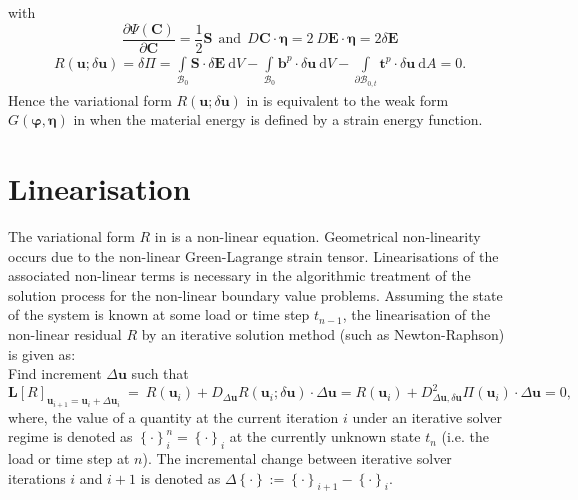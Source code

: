 with 
\begin{equation}
\dfrac{\partial \Psi (\mathbf{C})}{\partial \mathbf{C}} = \dfrac{1}{2} \mathbf{S} \ \ \text{and} \ \ D \mathbf{C} \cdot \bm{\eta} = 2 \ D \mathbf{E} \cdot \bm{\eta} = 2 \delta \mathbf{E}
\label{eq:2.12.2}
\end{equation}
\begin{align}
R(\mathbf{u}; \delta \mathbf{u}) =\delta \Pi = \int\limits_{\mathcal{B}_0} \mathbf{S} \cdot \delta \mathbf{E} \ \mathrm{d}V - \int\limits_{\mathcal{B}_0} \mathbf{b}^p \cdot \delta \mathbf{u} \ \mathrm{d}V - \int\limits_{\mathcal{\partial B}_{0,t}} \mathbf{t}^p \cdot \delta \mathbf{u} \ \mathrm{d}A = 0. 
\label{eq:2.13}
\end{align}
Hence the variational form $R(\mathbf{u}; \delta \mathbf{u})$ in  is equivalent to the weak form $G(\bm{\varphi},\bm{\eta})$ in  when the material energy is defined by a strain energy function. 

\section{Linearisation}
The variational form $R$ in  is a non-linear equation. Geometrical non-linearity occurs due to the non-linear Green-Lagrange strain tensor. Linearisations of the associated non-linear terms is necessary in the algorithmic treatment of the solution process for the non-linear boundary value problems. Assuming the state of the system is known at some load or time step $t_{n-1}$, the linearisation of the non-linear residual $R$ by an iterative solution method (such as Newton-Raphson) is given as: \\
\noindent Find increment $\Delta \mathbf{u}$ such that 
\begin{equation}
\mathbf{L}\left[ R \right]_{\mathbf{u}_{i+1} = \mathbf{u}_{i} + \Delta \mathbf{u}_i} \ = \ R(\mathbf{u}_{i}) + D_{\Delta\mathbf{u}} R(\mathbf{u}_i; \delta \mathbf{u}) \cdot \Delta\mathbf{u} = R(\mathbf{u}_{i}) + D^2_{\Delta\mathbf{u}, \delta\mathbf{u}} \Pi(\mathbf{u}_{i}) \cdot \Delta\mathbf{u} = 0,
\label{eq:2.14}
\end{equation}
where, the value of a quantity at the current iteration $i$ under an iterative solver regime is denoted as ${\left\lbrace \cdot \right\rbrace}_{i}^{n} = {\left\lbrace \cdot \right\rbrace}_{i}$ at the currently unknown state $t_n$ (i.e. the load or time step at $n$). The incremental change between iterative solver iterations $i$ and $i+1$ is denoted as $\Delta \left\lbrace \cdot \right\rbrace := {\left\lbrace \cdot \right\rbrace}_{i+1} - {\left\lbrace \cdot \right\rbrace}_{i}$. \par 

